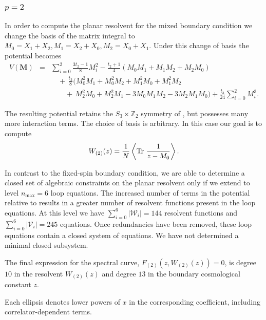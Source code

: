 

\subsubsection{$p=2$}
In order to compute the planar resolvent for the mixed boundary condition we change the basis of
the matrix integral  to $M_0 = X_1 + X_2, M_1 = X_2 + X_0, M_2 = X_0 + X_1$. Under
this change of basis the potential becomes
%
\begin{eqnarray}
    \label{mixedAction}
    V(\mathbf{M}) & = & \sum_{i=0}^2 \frac{3t_2 - 1}{8}  M_i^2  - \frac{t_2 + 1}{4} \left( M_0 M_1 + M_1 M_2 + M_2 M_0 \right) \\
                  &   & \quad + \, \frac{t_3}{8} \big( M_0^2 M_1 + M_0^2 M_2 + M_1^2 M_0 + M_1^2 M_2 \nonumber \\
                  &   & \quad\quad + \, M_2^2 M_0 + M_2^2 M_1 - 3 M_0 M_1 M_2 - 3 M_2 M_1 M_0 \big)
    +\frac{t_3}{24}\sum_{i=0}^2 M_i^3.  \nonumber
\end{eqnarray}

%
\noindent The resulting potential retains the $S_3\times\mathbb{Z}_2$ symmetry of , but
possesses many more interaction terms. The choice of basis is arbitrary. In this case our
goal is to compute
%
\begin{equation}
    W_{(2)}(z) = \frac{1}{N} \left\langle \mathop{\mathrm{Tr}}\nolimits\, \frac{1}{z-M_0} \right\rangle.
\end{equation}
%

In contrast to the fixed-spin boundary condition, we are able to determine a closed set of
algebraic constraints on the planar resolvent only if we extend to level $n_{\mathrm{max}} = 6$
loop equations. The increased number of terms in the potential relative to 
results in a greater number of resolvent functions present in the loop equations. At this level we
have $\sum_{i=0}^6|\mathcal{W}_i|=144$ resolvent functions and $\sum_{i=0}^6|\mathcal{V}_i|=245$
equations. Once redundancies have been removed, these loop equations contain a closed system of
equations. We have not determined a minimal closed subsystem.

The final expression for the spectral curve,     $F_{(2)}\!\left(z,W_{(2)}(z)\right)=0$, is degree $10$ in the resolvent $W_{(2)}(z)$ and degree
$13$ in the boundary cosmological constant $z$. 

\begin{samepage}
    
\end{samepage}
\noindent Each ellipsis denotes lower powers of $x$ in the corresponding coefficient, including 
correlator-dependent terms. 

